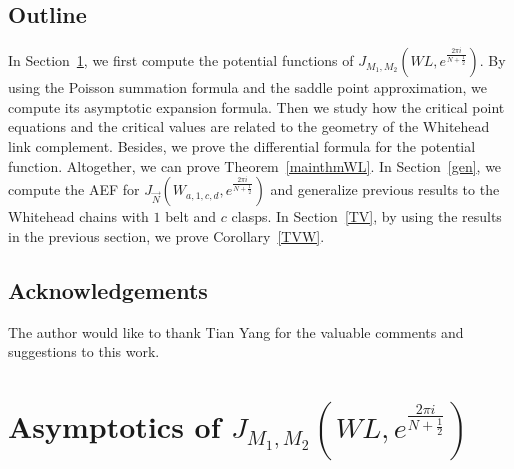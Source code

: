 \documentclass[10pt,a4paper]{article}
\begin{document}
\subsection{Outline}
In Section~\ref{formula}, we first compute the potential functions of $J_{M_1,M_2}(WL,e^{\frac{2\pi i}{N+\frac{1}{2}}})$. By using the Poisson summation formula and the saddle point approximation, we compute its asymptotic expansion formula. Then we study how the critical point equations and the critical values are related to the geometry of the Whitehead link complement. Besides, we prove the differential formula for the potential function. Altogether, we can prove Theorem~\ref{mainthmWL}. In Section~\ref{gen}, we compute the AEF for $J_{\vec{N}}(W_{a,1,c,d},e^{\frac{2\pi i}{N+\frac{1}{2}}})$ and generalize previous results to the Whitehead chains with $1$ belt and $c$ clasps. In Section~\ref{TV}, by using the results in the previous section, we prove Corollary~\ref{TVW}.

\subsection{Acknowledgements}
The author would like to thank Tian Yang for the valuable comments and suggestions to this work. 

\section{Asymptotics of $J_{M_1,M_2}(WL,e^{\frac{2\pi i}{N+\frac{1}{2}}})$}\label{formula}
\end{document}
